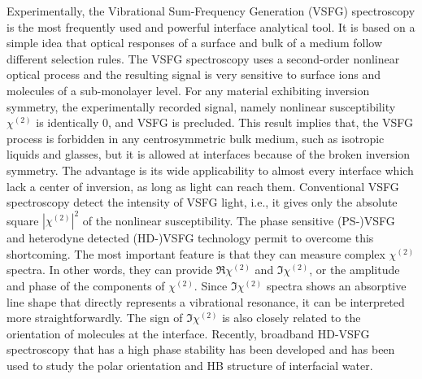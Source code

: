 Experimentally, the Vibrational Sum-Frequency Generation (VSFG) spectroscopy is the most frequently used and powerful interface analytical tool\cite{Shen2016,Morita2018,Shen2020}.
It is based on a simple idea that optical responses of a surface and bulk of a medium follow different selection rules.
The VSFG spectroscopy uses a second-order nonlinear optical process and the resulting signal is very sensitive to surface ions and 
molecules of a sub-monolayer level\cite{Morita2008,WangHongFei2015,WenYuChieh2016,Ishiyama2017,Penalber-Johnstone2018}. 
%
For any material exhibiting inversion symmetry, the experimentally recorded signal, namely nonlinear susceptibility $\chi^{(2)}$ is identically 0, and VSFG is precluded\cite{Franken1963}.
This result implies that, the VSFG process is forbidden in any centrosymmetric bulk medium\cite{CheM2012},
such as isotropic liquids and glasses, but it is allowed at interfaces because of the broken inversion symmetry\cite{PF00}.
The advantage is its wide applicability to almost every interface which lack a center of inversion, as long as light can reach them. 
%
Conventional VSFG spectroscopy detect the intensity of VSFG light,
i.e., it gives only the absolute square $|\chi^{(2)}|^2$ of the nonlinear susceptibility\cite{ShenYR1984,Guyot-Sionnest1986,Shen2020}. 
The phase sensitive (PS-)VSFG\cite{JiN2008} and heterodyne detected (HD-)VSFG technology permit to overcome this shortcoming. 
The most important feature is that they can measure complex $\chi^{(2)}$ spectra. 
In other words, they can provide $\Re \chi^{(2)}$ and $\Im \chi^{(2)}$, or the amplitude and phase of the components of $\chi^{(2)}$. 
Since $\Im \chi^{(2)}$ spectra shows an absorptive line shape that directly represents a vibrational resonance, 
it can be interpreted more straightforwardly\cite{Nihonyanagi2013}.
The sign of $\Im \chi^{(2)}$ is also closely related to the orientation of molecules at the interface\cite{TianCS2008,TianCS2009,TianCS2011}.
Recently, broadband HD-VSFG spectroscopy that has a high phase stability has been developed and has been used to study the polar orientation and HB structure of interfacial
water\cite{Nihonyanagi2009,Shen2013}. 

